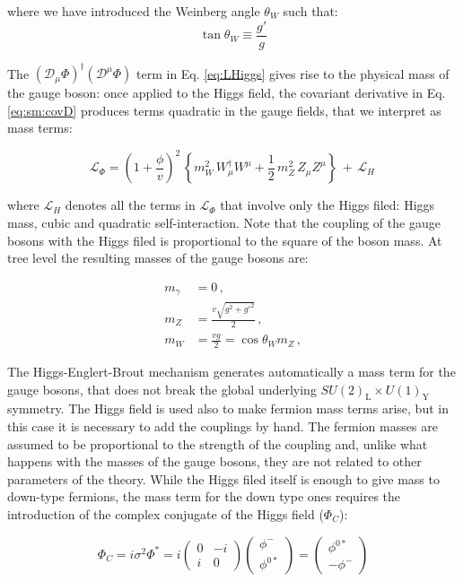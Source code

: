 \noindent where we have introduced the Weinberg angle $\theta_W$ such that:
\begin{equation}
\tan\theta_W \equiv \frac{g'}{g}
\end{equation}


The $(\mathcal{D}_{\mu} \Phi)^{\dagger} (\mathcal{D}^{\mu} \Phi)$ term in Eq. \ref{eq:LHiggs} gives rise to the physical mass of the gauge boson: once applied to the Higgs field, the covariant derivative in Eq. \ref{eq:sm:covD} produces terms quadratic in the gauge fields, that we interpret as mass terms:

\begin{equation}
\mathcal{L}_{\Phi} = \left(1+\frac{\phi}{v}\right)^2 \,
\left\{ m_W^2\, W_\mu^\dagger W^\mu
+ \frac{1}{2}\, m_Z^2\, Z_\mu Z^\mu \right\}\, +\, \mathcal{L}_H\, 
\end{equation}

where $\mathcal{L}_H$ denotes all the terms in $\mathcal{L}_{\Phi}$ that involve only the Higgs filed: Higgs mass, cubic and quadratic self-interaction. Note that the coupling of the gauge bosons with the Higgs filed is proportional to the square of the boson mass.
At tree level the resulting masses of the gauge bosons are:

\begin{equation}
\begin{aligned}
m_\gamma &= 0 \, ,\\
m_Z &= \frac{v \sqrt{g^2 + g'^2}}{2} \, , \\
m_W &= \frac{vg}{2} =  \cos\theta_W m_Z \, ,
\end{aligned}
\end{equation}


The Higgs-Englert-Brout mechanism generates automatically a mass term for the gauge bosons, that does not break the global underlying $SU(2)_\mathrm{L} \times U(1)_\mathrm{Y}$ symmetry. The Higgs field is used also to make fermion mass terms arise, but in this case it is necessary to add the couplings by hand. The fermion masses are assumed to be proportional to the strength of the coupling and, unlike what happens with the masses of the gauge bosons, they are not related to other parameters of the theory. While the Higgs filed itself is enough to give mass to down-type fermions, the mass term for the down type ones requires the introduction of the complex conjugate of the Higgs field ($\Phi_C$):

\begin{equation}
 \Phi_C = i \sigma^2 \Phi^* 
	= i \left( \begin{array}{cc} 0 & -i \\ i & 0 \end{array} \right) 
	\left( \begin{array}{c} \phi^- \\ \phi^{0*} \end{array} \right)
	= \left( \begin{array}{c} \phi^{0*} \\ - \phi^- \end{array} \right)
\end{equation}

